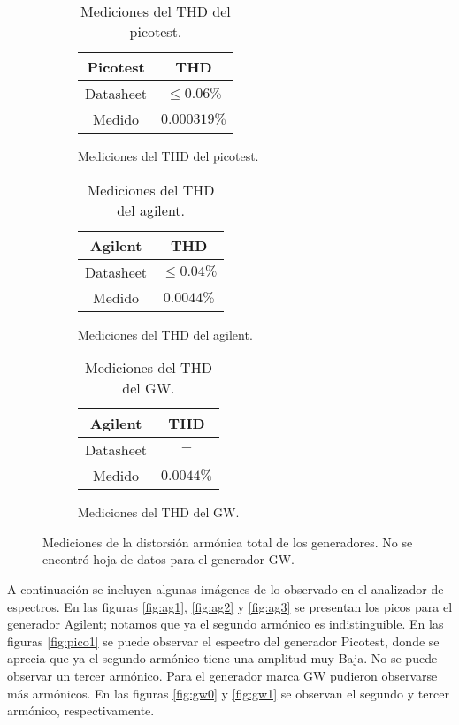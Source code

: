 \begin{figure}[H]
\begin{subfigure}{0.33\textwidth}
\begin{table}[H]
\centering
\begin{tabular}{@{}cc@{}}
\toprule
Picotest & THD\\ \midrule
Datasheet & $\leq 0.06\%$  \\
Medido & $0.000319\%$ \\ \bottomrule
\end{tabular}
\caption{Mediciones del THD del picotest.}
\end{table}
\end{subfigure}
\begin{subfigure}{0.33\textwidth}
\begin{table}[H]
\centering
\begin{tabular}{@{}cc@{}}
\toprule
Agilent & THD \\ \midrule
Datasheet & $\leq 0.04\%$ \\
Medido & $0.0044\%$ \\ \bottomrule
\end{tabular}
\caption{Mediciones del THD del agilent.}
\end{table}
\end{subfigure}
\begin{subfigure}{0.33\textwidth}
\begin{table}[H]
\centering
\begin{tabular}{@{}cc@{}}
\toprule
Agilent & THD \\ \midrule
Datasheet & $-$ \\
Medido & $0.0044\%$ \\ \bottomrule
\end{tabular}
\caption{Mediciones del THD del GW.}
\end{table}
\end{subfigure}
\caption{Mediciones de la distorsión armónica total de los generadores. No se encontró hoja de datos para el generador GW.}
\end{figure}

A continuación se incluyen algunas imágenes de lo observado en el analizador de espectros. En las figuras \ref{fig:ag1}, \ref{fig:ag2} y \ref{fig:ag3} se presentan los picos para el generador Agilent; notamos que ya el segundo armónico es indistinguible. En las figuras \ref{fig:pico1} se puede observar el espectro del generador Picotest, donde se aprecia que ya el segundo armónico tiene una amplitud muy Baja. No se puede observar un tercer armónico. Para el generador marca GW pudieron observarse más armónicos. En las figuras \ref{fig:gw0} y \ref{fig:gw1} se observan el segundo y tercer armónico, respectivamente.

